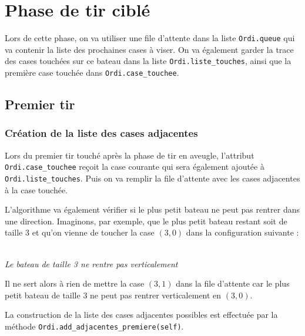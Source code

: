 \section{Phase de tir ciblé}
Lors de cette phase, on va utiliser une file d'attente dans la liste \texttt{Ordi.queue} qui va contenir la liste des prochaines cases à viser. On va également garder la trace des cases touchées sur ce bateau dans la liste \texttt{Ordi.liste\_touches}, ainsi que la première case touchée dans \texttt{Ordi.case\_touchee}.
\subsection{Premier tir}
\subsubsection{Création de la liste des cases adjacentes}
Lors du premier tir touché après la phase de tir en aveugle, l'attribut \texttt{Ordi.case\_touchee} reçoit la case courante qui sera également ajoutée à \texttt{Ordi.liste\_touches}. Puis on va remplir la file d'attente avec les cases adjacentes à la case touchée.

L'algorithme va également vérifier si le plus petit bateau ne peut pas rentrer dans une direction. Imaginons, par exemple, que le plus petit bateau restant soit de taille 3 et qu'on vienne de toucher la case $(3,0)$ dans la configuration suivante :

\begin{center}
\\
\textit{Le bateau de taille 3 ne rentre pas verticalement}
\end{center}
Il ne sert alors à rien de mettre la case $(3,1)$ dans la file d'attente car le plus petit bateau de taille 3 ne peut pas rentrer verticalement en $(3,0)$.

La construction de la liste des cases adjacentes possibles est effectuée par la méthode \texttt{Ordi.add\_adjacentes\_premiere(self)}.

